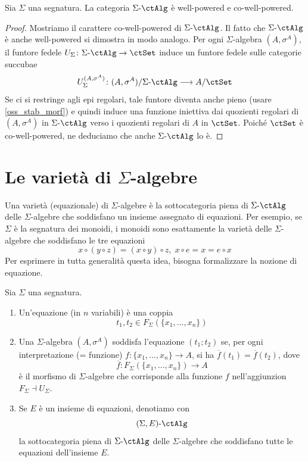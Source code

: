 \begin{proposition}\label{prop_alg_cowellpow}
 Sia \(\Sigma\) una segnatura. La categoria \(\ctSAlg\) è well-powered e co-well-powered.
\end{proposition}

\begin{proof}
 Mostriamo il carattere co-well-powered di \(\ctSAlg\). Il fatto che \(\ctSAlg\) è anche well-powered si dimostra in modo analogo.
 Per ogni \(\Sigma\)-algebra \((A,\sigma^A)\), il funtore fedele \(U_{\Sigma} \colon \ctSAlg \to \ctSet\) induce un funtore fedele sulle
 categorie succubae
 \[U_{\Sigma}^{(A,\sigma^A)} \colon (A,\sigma^A) / \ctSAlg \fun A/\ctSet\]
 Se ci si restringe agli epi regolari, tale funtore diventa anche pieno (usare \ref{oss_stab_morf}) e quindi induce una
 funzione iniettiva dai quozienti regolari di \((A,\sigma^A)\) in \(\ctSAlg\) verso i quozienti regolari di \(A\) in \(\ctSet\). Poiché \(\ctSet\)
 è co-well-powered, ne deduciamo che anche \(\ctSAlg\) lo è.
\end{proof}

\section{Le varietà di \(\Sigma\)-algebre}\label{sec_var_alg}

Una varietà (equazionale) di \(\Sigma\)-algebre è la sottocategoria piena di \(\ctSAlg\) delle \(\Sigma\)-algebre che soddisfano un insieme
assegnato di equazioni. Per esempio, se \(\Sigma\) è la segnatura dei monoidi, i monoidi sono esattamente la varietà delle \(\Sigma\)-algebre
che soddisfano le tre equazioni
\[x \circ (y \circ z) = (x \circ y) \circ z, \; x \circ e = x = e \circ x\]
Per esprimere in tutta generalità questa idea, bisogna formalizzare la nozione di equazione.

\begin{definition}\label{def_equaz_alg}
 Sia \(\Sigma\) una segnatura.
 \begin{enumerate}
  \item Un'equazione (in \(n\) variabili) è una coppia
        \[t_1,t_2 \in F_{\Sigma}(\{x_1,\ldots,x_n\})\]
  \item Una \(\Sigma\)-algebra \((A,\sigma^A)\) soddisfa l'equazione \((t_1;t_2)\) se, per ogni interpretazione (= funzione)
        \(f \colon \{x_1,\ldots,x_n\} \to A\),
        si ha \(\overline{f}(t_1) = \overline{f}(t_2)\), dove
        \[\overline{f} \colon F_{\Sigma}(\{x_1,\ldots,x_n\}) \to A\]
        è il morfismo di \(\Sigma\)-algebre che corrisponde alla funzione \(f\) nell'aggiunzion \(F_{\Sigma} \dashv U_{\Sigma}\).
  \item Se \(E\) è un insieme di equazioni, denotiamo con
        \[\ctSEAlg\]
        la sottocategoria piena di \(\ctSAlg\) delle \(\Sigma\)-algebre che soddisfano tutte le equazioni dell'insieme \(E\).
 \end{enumerate}
\end{definition}

